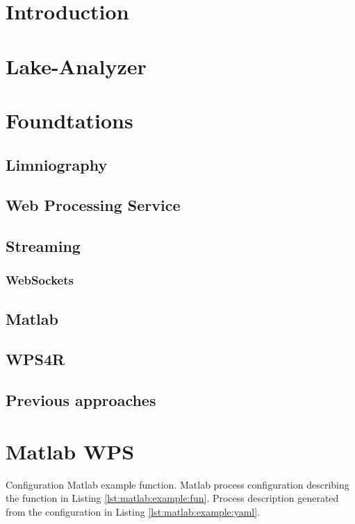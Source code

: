 \section{Introduction}
	\section{Lake-Analyzer}
	\section{Foundtations}
		\subsection{Limniography}
		\subsection{Web Processing Service}
		\subsection{Streaming}
			\subsubsection{WebSockets}
		\subsection{Matlab}
		\subsection{WPS4R}
		\subsection{Previous approaches}
	\section{Matlab WPS}


		\newcommand{\listing}

		\subsection{Configuration}
			{\label{lst:matlab:example:fun}Matlab example function.}
			{\label{lst:matlab:example:yaml}Matlab process configuration describing the function in Listing \ref{lst:matlab:example:fun}.}
			{\label{lst:matlab:example:desc}Process description generated from the configuration in Listing \ref{lst:matlab:example:yaml}.}

